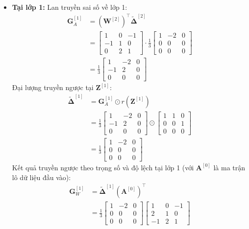 \begin{itemize}
    \item \textbf{Tại lớp 1:}
    Lan truyền sai số về lớp 1:
    \begin{align*}
    \mathbf{G}_A^{[1]} &= \left(\mathbf{W}^{[2]}\right)^{\top} \widetilde{\boldsymbol{\Delta}}^{[2]} \\
    &= \begin{bmatrix} 1 & 0 & -1 \\ -1 & 1 & 0 \\ 0 & 2 & 1 \end{bmatrix} \cdot \frac{1}{3}\begin{bmatrix} 1 & -2 & 0 \\ 0 & 0 & 0 \\ 0 & 0 & 0 \end{bmatrix} \\
    &= \frac{1}{3}\begin{bmatrix} 1 & -2 & 0 \\ -1 & 2 & 0 \\ 0 & 0 & 0 \end{bmatrix}
    \end{align*}
    Đại lượng truyền ngược tại $\mathbf{Z}^{[1]}$:
    \begin{align*}
    \widetilde{\boldsymbol{\Delta}}^{[1]} &= \mathbf{G}_A^{[1]} \odot r\!\left(\mathbf{Z}^{[1]}\right) \\
    &= \frac{1}{3}\begin{bmatrix} 1 & -2 & 0 \\ -1 & 2 & 0 \\ 0 & 0 & 0 \end{bmatrix} \odot \begin{bmatrix} 1 & 1 & 0 \\ 0 & 0 & 1 \\ 0 & 0 & 0 \end{bmatrix} \\
    &= \frac{1}{3}\begin{bmatrix} 1 & -2 & 0 \\ 0 & 0 & 0 \\ 0 & 0 & 0 \end{bmatrix}
    \end{align*}
    Kết quả truyền ngược theo trọng số và độ lệch tại lớp 1 (với $\mathbf{A}^{[0]}$ là ma trận lô dữ liệu đầu vào):
    \begin{align*}
    \mathbf{G}_W^{[1]} &= \widetilde{\boldsymbol{\Delta}}^{[1]}\left(\mathbf{A}^{[0]}\right)^{\top} \\
    &= \frac{1}{3}\begin{bmatrix} 1 & -2 & 0 \\ 0 & 0 & 0 \\ 0 & 0 & 0 \end{bmatrix}\begin{bmatrix} 1 & 0 & -1 \\ 2 & 1 & 0 \\ -1 & 2 & 1 \end{bmatrix} \\

\end{align*}
\end{itemize}

